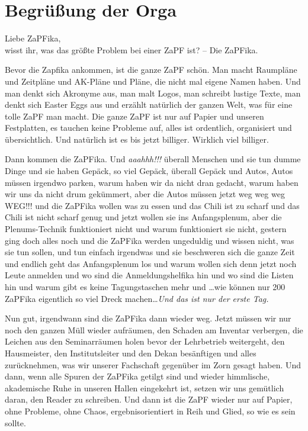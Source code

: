 
\section*{Begrüßung der Orga}
Liebe ZaPFika,\\

\noindent wisst ihr, was das größte Problem bei einer ZaPF ist? -- Die ZaPFika.

Bevor die Zapfika ankommen, ist die ganze ZaPF schön. Man macht Raumpläne und Zeitpläne und AK-Pläne und Pläne, die nicht mal eigene Namen haben. Und man denkt sich Akronyme aus, man malt Logos, man schreibt lustige Texte, man denkt sich Easter Eggs aus und erzählt natürlich der ganzen Welt, was für eine tolle ZaPF man macht. Die ganze ZaPF ist nur auf Papier und unseren Festplatten, es tauchen keine Probleme auf, alles ist ordentlich, organisiert und übersichtlich. Und natürlich ist es bis jetzt billiger. Wirklich viel billiger.

Dann kommen die ZaPFika. Und \textit{aaahhh!!!} überall Menschen und sie tun dumme Dinge und sie haben Gepäck, so viel Gepäck, überall Gepäck und Autos, Autos müssen irgendwo parken, warum haben wir da nicht dran gedacht, warum haben wir uns da nicht drum gekümmert, aber die Autos müssen jetzt weg weg weg WEG!!! und die ZaPFika wollen was zu essen und das Chili ist zu scharf und das Chili ist nicht scharf genug und jetzt wollen sie ins Anfangsplenum, aber die Plenums-Technik funktioniert nicht und warum funktioniert sie nicht, gestern ging doch alles noch und die ZaPFika werden ungeduldig und wissen nicht, was sie tun sollen, und tun einfach irgendwas und sie beschweren sich die ganze Zeit und endlich geht das Anfangsplenum los und warum wollen sich denn jetzt noch Leute anmelden und wo sind die Anmeldungshelfika hin und wo sind die Listen hin und warum gibt es keine Tagungstaschen mehr und \dots wie können nur 200 ZaPFika eigentlich so viel Dreck machen\dots\textit{Und das ist nur der erste Tag.}

Nun gut, irgendwann sind die ZaPFika dann wieder weg. Jetzt müssen wir nur noch den ganzen Müll wieder aufräumen, den Schaden am Inventar verbergen, die Leichen aus den Seminarräumen holen bevor der Lehrbetrieb weitergeht, den Hausmeister, den Institutsleiter und den Dekan besänftigen und alles zurücknehmen, was wir unserer Fachschaft gegenüber im Zorn gesagt haben. Und dann, wenn alle Spuren der ZaPFika getilgt sind und wieder himmlische, akademische Ruhe in unseren Hallen eingekehrt ist, setzen wir uns gemütlich daran, den Reader zu schreiben. Und dann ist die ZaPF wieder nur auf Papier, ohne Probleme, ohne Chaos, ergebnisorientiert in Reih und Glied, so wie es sein sollte.

